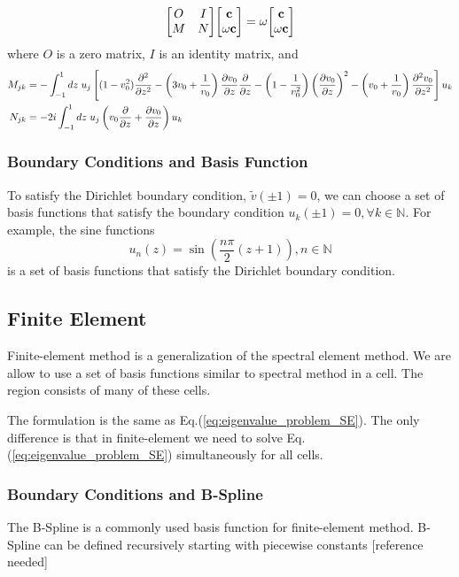 \begin{equation} \label{eq:eigenvalue_problem_SE}
	\mqty[ O & I\\ M & N ]\mqty[ \mathbf{c}\\ \omega\mathbf{c} ] = \omega\mqty[ \mathbf{c}\\ \omega\mathbf{c} ]
\end{equation}
where $O$ is a zero matrix, $I$ is an identity matrix, and
\begin{align*}
	M_{jk} &= -\int_{-1}^{1}dz \; u_{j} \left[(1-v_0^2)\pdv[2]{}{z} 
	-\left(3v_0 + \frac{1}{v_0}\right)\pdv{v_0}{z}\pdv{}{z} 
	- \left(1-\frac{1}{v_0^2}\right)\left(\pdv{v_0}{z}\right)^2 
	- \left(v_0+\frac{1}{v_0}\right)\pdv[2]{v_0}{z}\right] u_{k} \\
	N_{jk} &= -2i\int_{-1}^{1}dz \; u_{j}\left(v_0\pdv{}{z} +\pdv{v_0}{z} \right)u_{k}
\end{align*}

\subsubsection{Boundary Conditions and Basis Function}
To satisfy the Dirichlet boundary condition, $\tilde{v}(\pm 1)=0$, we can choose a set of basis functions that satisfy the boundary condition $u_k(\pm 1)=0,\forall k\in\mathbb{N}$. For example, the sine functions
\[ u_n(z) = \sin(\frac{n\pi}{2}(z+1)), n\in\mathbb{N} \]
is a set of basis functions that satisfy the Dirichlet boundary condition.


\subsection{Finite Element}
Finite-element method is a generalization of the spectral element method. We are allow to use a set of basis functions similar to spectral method in a cell. The region consists of many of these cells.

The formulation is the same as Eq.(\ref{eq:eigenvalue_problem_SE}). The only difference is that in finite-element we need to solve Eq.(\ref{eq:eigenvalue_problem_SE}) simultaneously for all cells.

\subsubsection{Boundary Conditions and B-Spline}
The B-Spline is a commonly used basis function for finite-element method. B-Spline can be defined recursively starting with piecewise constants [reference needed]

